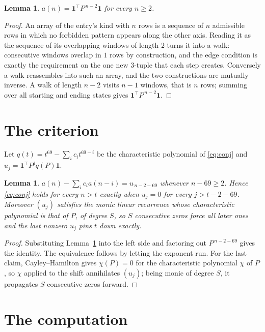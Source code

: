 \documentclass[11pt,a4paper]{article}
\theoremstyle{plain}
\newtheorem{lemma}[theorem]{Lemma}
\theoremstyle{definition}
\begin{document}
\begin{lemma}\label{lem:walk}
$a(n)=\mathbf{1}^{\!\top}P^{\,n-2}\mathbf{1}$ for every $n\ge2$.
\end{lemma}

\begin{proof}
An array of the entry's kind with $n$ rows is a sequence of $n$ admissible rows in
which no forbidden pattern appears along the other axis. Reading it as the sequence of its
overlapping windows of length $2$ turns it into a walk: consecutive windows overlap in
$1$ rows by construction, and the edge condition is exactly the requirement on the one
new $3$-tuple that each step creates. Conversely a walk reassembles into such an array,
and the two constructions are mutually inverse. A walk of length $n-2$ visits $n-1$
windows, that is $n$ rows; summing over all starting and ending states gives
$\mathbf{1}^{\!\top}P^{\,n-2}\mathbf{1}$.
\end{proof}

\section{The criterion}

Let $q(t)=t^{69}-\sum_i c_i t^{69-i}$ be the characteristic polynomial of
\eqref{eq:conj} and $u_j=\mathbf{1}^{\!\top}P^{j}q(P)\mathbf{1}$.

\begin{lemma}\label{lem:crit}
$a(n)-\sum_i c_i a(n-i)=u_{\,n-2-69}$ whenever $n-69\ge2$. Hence
\eqref{eq:conj} holds for every $n>t$ exactly when $u_j=0$ for every
$j>t-2-69$. Moreover $(u_j)$ satisfies the monic linear recurrence whose
characteristic polynomial is that of $P$, of degree $S$, so $S$ consecutive zeros force all
later ones and the last nonzero $u_j$ pins $t$ down exactly.
\end{lemma}

\begin{proof}
Substituting Lemma~\ref{lem:walk} into the left side and factoring out
$P^{\,n-2-69}$ gives the identity. The equivalence follows by letting the exponent
run. For the last claim, Cayley--Hamilton gives $\chi(P)=0$ for the characteristic
polynomial $\chi$ of $P$, so $\chi$ applied to the shift annihilates $(u_j)$; being monic of
degree $S$, it propagates $S$ consecutive zeros forward.
\end{proof}

\section{The computation}
\end{document}
